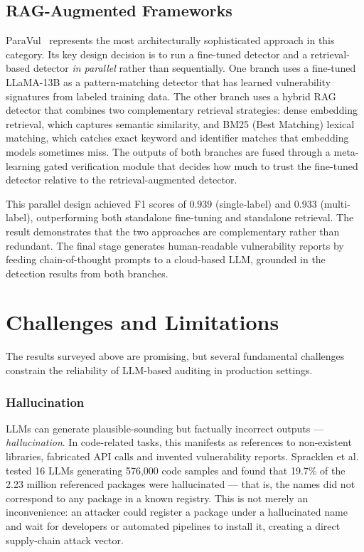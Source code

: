 \subsection{RAG-Augmented Frameworks}
\label{subsec:rag-augmented}

ParaVul~\cite{huang2025paravul} represents the most architecturally sophisticated approach in this category. Its key design decision is to run a fine-tuned detector and a retrieval-based detector \emph{in parallel} rather than sequentially. One branch uses a fine-tuned LLaMA-13B as a pattern-matching detector that has learned vulnerability signatures from labeled training data. The other branch uses a hybrid RAG detector that combines two complementary retrieval strategies: dense embedding retrieval, which captures semantic similarity, and BM25 (Best Matching) lexical matching, which catches exact keyword and identifier matches that embedding models sometimes miss. The outputs of both branches are fused through a meta-learning gated verification module that decides how much to trust the fine-tuned detector relative to the retrieval-augmented detector.

This parallel design achieved F1 scores of 0.939 (single-label) and 0.933 (multi-label), outperforming both standalone fine-tuning and standalone retrieval. The result demonstrates that the two approaches are complementary rather than redundant. The final stage generates human-readable vulnerability reports by feeding chain-of-thought prompts to a cloud-based LLM, grounded in the detection results from both branches.

\section{Challenges and Limitations}
\label{sec:llm-challenges}

The results surveyed above are promising, but several fundamental challenges constrain the reliability of LLM-based auditing in production settings.

\subsubsection*{Hallucination}
LLMs can generate plausible-sounding but factually incorrect outputs --- \emph{hallucination}. In code-related tasks, this manifests as references to non-existent libraries, fabricated API calls and invented vulnerability reports. Spracklen et al.~\cite{spracklen2025} tested 16 LLMs generating 576{,}000 code samples and found that 19.7\% of the 2.23 million referenced packages were hallucinated --- that is, the names did not correspond to any package in a known registry. This is not merely an inconvenience: an attacker could register a package under a hallucinated name and wait for developers or automated pipelines to install it, creating a direct supply-chain attack vector.

